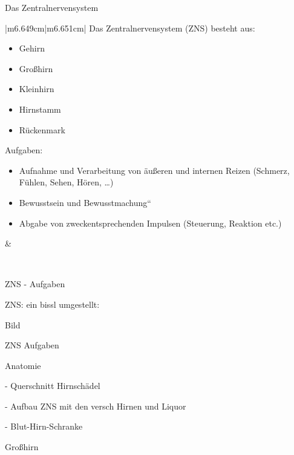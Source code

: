 \documentclass{article}
\begin{document}
Das Zentralnervensystem

\begin{center}
\tablehead{}\begin{supertabular}{|m{6.649cm}|m{6.651cm}|}
\hline
Das Zentralnervensystem (ZNS) besteht aus:

\begin{itemize}
\item Gehirn

\end{itemize}
\begin{itemize}
\item Gro{\ss}hirn

\item Kleinhirn

\item Hirnstamm

\end{itemize}
\begin{itemize}
\item R\"uckenmark

\end{itemize}
Aufgaben:

\begin{itemize}
\item Aufnahme  und Verarbeitung  von \"au{\ss}eren und internen  Reizen
(Schmerz, F\"uhlen, Sehen, H\"oren, {\dots})

\item Bewusstsein und {\quotedblbase}Bewusstmachung{\textquotedblleft}

\item Abgabe  von zweckentsprechenden Impulsen  (Steuerung, Reaktion
etc.)

\end{itemize}
 &
\par

\\\hline
\end{supertabular}
\end{center}
%
%
ZNS - Aufgaben

\begin{center}
\begin{minipage}{4.001cm}
ZNS: ein bissl umgestellt:

Bild

ZNS Aufgaben

Anatomie

{}- Querschnitt Hirnsch\"adel

{}- Aufbau ZNS mit den versch Hirnen und Liquor

{}- Blut-Hirn-Schranke

\end{minipage}
\end{center}
Gro{\ss}hirn
\end{document}

